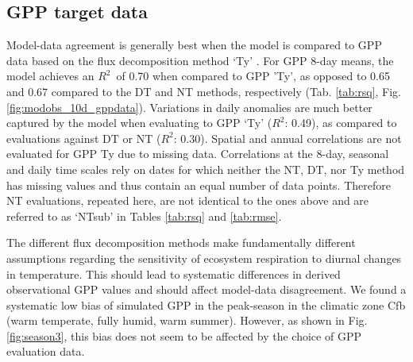 \documentclass{myreport}
\newcommand{\rsq}{$R^2$}
\begin{document}
\clearpage

\subsection{GPP target data}
\label{sec:results_gppdata}

Model-data agreement is generally best when the model is compared to GPP data based on the flux decomposition method `Ty' \citep{wang17natpl}. For GPP  8-day means, the model achieves an \rsq\ of 0.70 when compared to GPP 'Ty', as opposed to 0.65 and 0.67 compared to the DT and NT methods, respectively (Tab. \ref{tab:rsq}, Fig. \ref{fig:modobs_10d_gppdata}). Variations in daily anomalies are much better captured by the model when evaluating to GPP `Ty' (\rsq : 0.49), as compared to evaluations against DT or NT (\rsq : 0.30). Spatial and annual correlations are not evaluated for GPP Ty due to missing data. Correlations at the 8-day, seasonal and daily time scales rely on dates for which neither the NT, DT, nor Ty method has missing values and thus contain an equal number of data points. Therefore NT evaluations, repeated here, are not identical to the ones above and are referred to as `NTsub' in Tables \ref{tab:rsq} and \ref{tab:rmse}. 

The different flux decomposition methods make fundamentally different assumptions regarding the sensitivity of ecosystem respiration to diurnal changes in temperature. This should lead to systematic differences in derived observational GPP values and should affect model-data disagreement. We found a systematic low bias of simulated GPP in the peak-season in the climatic zone Cfb (warm temperate, fully humid, warm summer). However, as shown in Fig. \ref{fig:season3}, this bias does not seem to be affected by the choice of GPP evaluation data.
\end{document}
